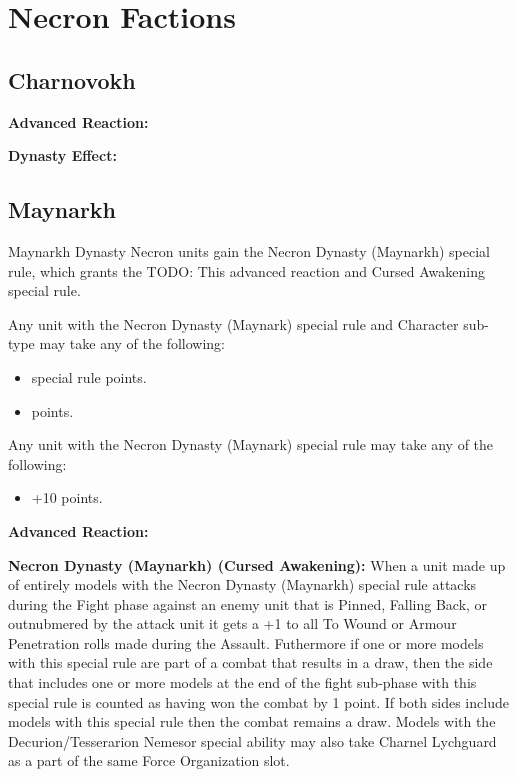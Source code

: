 \section{Necron Factions}

\subsection{Charnovokh}

\textbf{Advanced Reaction:}

\textbf{Dynasty Effect:}


\subsection{Maynarkh}

Maynarkh Dynasty Necron units gain the Necron Dynasty (Maynarkh) special rule, which grants the TODO: This advanced reaction and Cursed Awakening special rule. 

Any unit with the Necron Dynasty (Maynark) special rule and Character sub-type may take any of the following:
\begin{itemize}
	\item {} special rule  points.
	\item {}  points.
\end{itemize}

Any unit with the Necron Dynasty (Maynark) special rule may take any of the following:
\begin{itemize}
	\item {} \dotfill +10 points.
\end{itemize}

\textbf{Advanced Reaction:}

\textbf{Necron Dynasty (Maynarkh) (Cursed Awakening):} When a unit made up of entirely models with the Necron Dynasty (Maynarkh) special rule attacks during the Fight phase against an enemy unit that is Pinned, Falling Back, or outnubmered by the attack unit it gets a +1 to all To Wound or Armour Penetration rolls made during the Assault. Futhermore if one or more models with this special rule are part of a combat that results in a draw, then the side that includes one or more models at the end of the fight sub-phase with this special rule is counted as having won the combat by 1 point. If both sides include models with this special rule then the combat remains a draw. Models with the Decurion/Tesserarion Nemesor special ability may also take Charnel Lychguard as a part of the same Force Organization slot.


